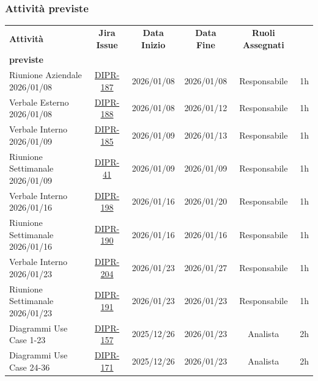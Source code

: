 \documentclass[a4paper,12pt]{article}
\begin{document}
\subsubsection{Attività previste}
\small
{}
\begin{longtable}{|p{4cm}|c|c|c|c|c|}
    \hline
    \rowcolor{zpusgreen!30}
    \textbf{Attività} & \textbf{Jira Issue} & \textbf{Data Inizio} & \textbf{Data Fine} & \textbf{Ruoli Assegnati} & \begin{tabular}[c]{@{}c@{}} \textbf{Ore} \\ \textbf{previste} \end{tabular} \\
    \hline
    Riunione Aziendale 2026/01/08 & \href{https://7zpus.atlassian.net/browse/DIPR-187}{DIPR-187}& 2026/01/08 & 2026/01/08 & Responsabile & 1h \\
    \hline
    Verbale Esterno 2026/01/08 & \href{https://7zpus.atlassian.net/browse/DIPR-188}{DIPR-188}& 2026/01/08 & 2026/01/12 & Responsabile & 1h \\
    \hline
    Verbale Interno 2026/01/09 & \href{https://7zpus.atlassian.net/browse/DIPR-185}{DIPR-185}& 2026/01/09 & 2026/01/13 & Responsabile & 1h \\
    \hline
    Riunione Settimanale 2026/01/09 & \href{https://7zpus.atlassian.net/browse/DIPR-41}{DIPR-41}& 2026/01/09 & 2026/01/09 & Responsabile & 1h \\
    \hline
    Verbale Interno 2026/01/16 & \href{https://7zpus.atlassian.net/browse/DIPR-198}{DIPR-198}& 2026/01/16 & 2026/01/20 & Responsabile & 1h \\
    \hline
    Riunione Settimanale 2026/01/16 & \href{https://7zpus.atlassian.net/browse/DIPR-190}{DIPR-190}& 2026/01/16 & 2026/01/16 & Responsabile & 1h \\
    \hline
    Verbale Interno 2026/01/23 & \href{https://7zpus.atlassian.net/browse/DIPR-204}{DIPR-204}& 2026/01/23 & 2026/01/27 & Responsabile & 1h \\
    \hline
    Riunione Settimanale 2026/01/23 & \href{https://7zpus.atlassian.net/browse/DIPR-191}{DIPR-191} & 2026/01/23 & 2026/01/23 & Responsabile & 1h \\
    \hline
    Diagrammi Use Case 1-23 & \href{https://7zpus.atlassian.net/browse/DIPR-157}{DIPR-157} & 2025/12/26 & 2026/01/23 & Analista & 2h \\
    \hline
    Diagrammi Use Case 24-36 & \href{https://7zpus.atlassian.net/browse/DIPR-171}{DIPR-171} & 2025/12/26 & 2026/01/23 & Analista & 2h \\

\end{longtable}
\end{document}
